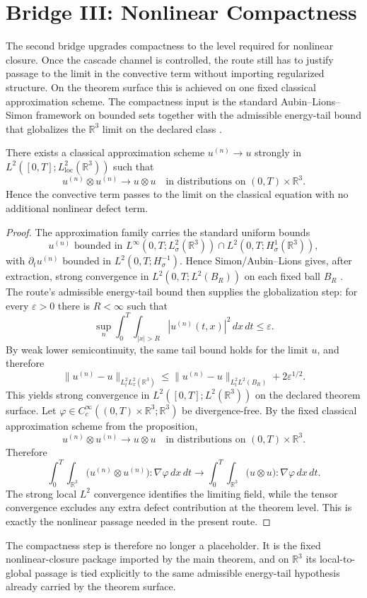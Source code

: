 \section{Bridge III: Nonlinear Compactness}

The second bridge upgrades compactness to the level required for nonlinear
closure. Once the cascade channel is controlled, the route still has to justify
passage to the limit in the convective term without importing regularized
structure. On the theorem surface this is achieved on one fixed classical
approximation scheme. The compactness input is the standard Aubin--Lions--Simon
framework on bounded sets together with the admissible energy-tail bound that
globalizes the \(\mathbb R^3\) limit on the declared class
\cite{Simon1987,BoyerFabrie2013,Temam2001}.

\begin{proposition}
\label{prop:compactness}
There exists a classical approximation scheme \(u^{(n)}\to u\) strongly in \(L^2([0,T];L^2_{\mathrm{loc}}(\mathbb{R}^3))\) such that
\[
u^{(n)}\otimes u^{(n)} \to u\otimes u
\quad\text{in distributions on } (0,T)\times\mathbb{R}^3.
\]
Hence the convective term passes to the limit on the classical equation with no additional nonlinear defect term.
\end{proposition}

\begin{proof}
The approximation family carries the standard uniform bounds
\[
u^{(n)} \text{ bounded in } L^\infty(0,T;L^2_\sigma(\mathbb R^3))
\cap L^2(0,T;H^1_\sigma(\mathbb R^3)),
\]
with \(\partial_t u^{(n)}\) bounded in \(L^2(0,T;H^{-1}_\sigma)\). Hence
Simon/Aubin--Lions gives, after extraction, strong convergence in
\(L^2(0,T;L^2(B_R))\) on each fixed ball \(B_R\)
\cite{Simon1987,BoyerFabrie2013}. The route's admissible energy-tail bound then
supplies the globalization step: for every \(\varepsilon>0\) there is
\(R<\infty\) such that
\[
\sup_n \int_0^T\!\!\int_{|x|>R} |u^{(n)}(t,x)|^2\,dx\,dt \le \varepsilon.
\]
By weak lower semicontinuity, the same tail bound holds for the limit \(u\),
and therefore
\[
\|u^{(n)}-u\|_{L^2_tL^2_x(\mathbb R^3)}
\le
\|u^{(n)}-u\|_{L^2_tL^2(B_R)} + 2\varepsilon^{1/2}.
\]
This yields strong convergence in \(L^2([0,T];L^2(\mathbb R^3))\) on the
declared theorem surface. Let
\(\varphi\in C_c^\infty((0,T)\times\mathbb{R}^3;\mathbb{R}^3)\) be
divergence-free. By the fixed classical approximation scheme from the
proposition,
\[
u^{(n)}\otimes u^{(n)} \to u\otimes u
\quad\text{in distributions on } (0,T)\times\mathbb{R}^3.
\]
Therefore
\[
\int_0^T\!\!\int_{\mathbb{R}^3}
\bigl(u^{(n)}\otimes u^{(n)}\bigr):\nabla\varphi\,dx\,dt
\to
\int_0^T\!\!\int_{\mathbb{R}^3}
\bigl(u\otimes u\bigr):\nabla\varphi\,dx\,dt.
\]
The strong local \(L^2\) convergence identifies the limiting field, while the tensor convergence excludes any extra defect contribution at the theorem level. This is exactly the nonlinear passage needed in the present route.
\end{proof}

The compactness step is therefore no longer a placeholder. It is the fixed
nonlinear-closure package imported by the main theorem, and on
\(\mathbb R^3\) its local-to-global passage is tied explicitly to the same
admissible energy-tail hypothesis already carried by the theorem surface.
